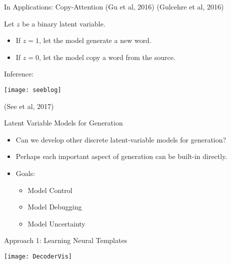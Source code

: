 \begin{frame}{ In Applications: Copy-Attention 
      \small{(Gu et al, 2016) (Gulcehre et al, 2016)}}

Let $z$ be a binary latent variable.
\air
\begin{itemize}
\item If $z = 1$, let the model generate a new word.
\item If $z = 0$, let the model copy a word from the source.
\end{itemize}

Inference:
\begin{center}


\texttt{[image: seeblog]}

\centerline{\small (See et al, 2017)}
\end{center}
\end{frame}


\begin{frame}{ Latent Variable Models for Generation}

  \begin{itemize}
  \item Can we develop other discrete latent-variable models for generation?
    \air
  \item Perhaps each important aspect of generation can be built-in directly.
    \air
  \item Goals:
    \begin{itemize}
    \item Model Control
    \item Model Debugging
    \item Model Uncertainty
    \end{itemize}
  \end{itemize}
\end{frame}



\begin{frame}{Approach 1: Learning Neural Templates}

  \begin{center}
    \texttt{[image: DecoderVis]}
  \end{center}
\end{frame}

